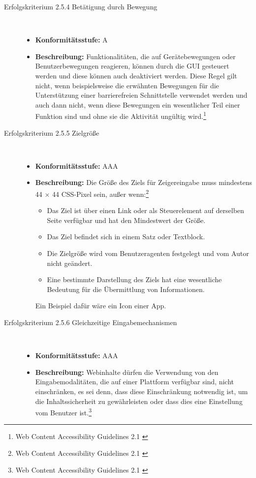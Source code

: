 \begin{description}
\begin{description}
		\item [Erfolgskriterium 2.5.4 Betätigung durch Bewegung]\hfill \\
		\begin{itemize}
			\item \textbf{Konformitätsstufe:} A
			\item \textbf{Beschreibung:} Funktionalitäten, die auf Gerätebewegungen oder Benutzerbewegungen reagieren, können durch die \ac{GUI} gesteuert werden und diese können auch 
			deaktiviert werden. Diese Regel gilt nicht, wenn beispielsweise die erwähnten Bewegungen für die Unterstützung einer barrierefreien Schnittstelle verwendet werden 
			und auch dann nicht, wenn diese Bewegungen ein wesentlicher Teil einer Funktion sind und ohne sie die Aktivität ungültig 
			wird.\footnote{Web Content Accessibility Guidelines 2.1 \cite{WCAG2.1}}
		\end{itemize}
		
		\item [Erfolgskriterium 2.5.5 Zielgröße]\hfill \\
		\begin{itemize}
			\item \textbf{Konformitätsstufe:} AAA
			\item \textbf{Beschreibung:} Die Größe des Ziels für Zeigereingabe muss mindestens 44 $\times$ 44 CSS-Pixel sein, außer 
			wenn:\footnote{Web Content Accessibility Guidelines 2.1 \cite{WCAG2.1}}
			\begin{itemize}
				\item Das Ziel ist über einen Link oder als Steuerelement auf derselben Seite verfügbar und hat den Mindestwert der Größe.
				\item Das Ziel befindet sich in einem Satz oder Textblock.
				\item Die Zielgröße wird vom Benutzeragenten festgelegt und vom Autor nicht geändert.
				\item Eine bestimmte Darstellung des Ziels hat eine wesentliche Bedeutung für die Übermittlung von Informationen.
			\end{itemize}
			
			Ein Beispiel dafür wäre ein Icon einer App.
		\end{itemize}
		
		\item [Erfolgskriterium 2.5.6 Gleichzeitige Eingabemechanismen]\hfill \\
		\begin{itemize}
			\item \textbf{Konformitätsstufe:} AAA
			\item \textbf{Beschreibung:} Webinhalte dürfen die Verwendung von den Eingabemodalitäten, die auf einer Plattform verfügbar sind, nicht einschränken, es sei denn, dass 
			diese Einschränkung notwendig ist, um die Inhaltssicherheit zu gewährleisten oder dass dies eine Einstellung vom Benutzer 
			ist.\footnote{Web Content Accessibility Guidelines 2.1 \cite{WCAG2.1}}
		\end{itemize}
	\end{description}		


\end{description}
